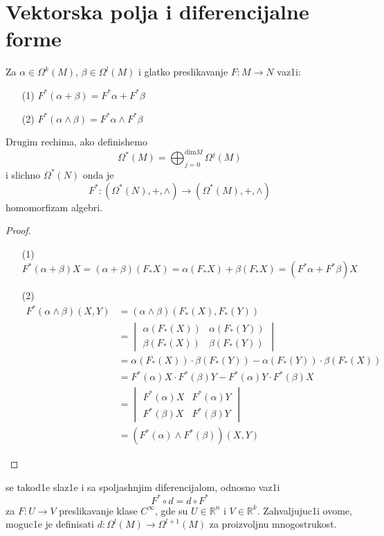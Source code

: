 \documentclass[a4paper,12pt]{article}
\newcommand{\latin}{\fontencoding{T1}\selectfont}
\newcommand{\RR}{\mathbb{R}}
\renewcommand{\dim}{\mathrm{dim}}
\begin{document}
\section{Vektorska polja i diferencijalne forme}

\begin{tvr}
Za $\alpha \in \Omega^k(M)$, $\beta \in \Omega^l(M)$ i glatko preslikavanje $F: M \to N$ vaz1i:
\begin{itemize}
\item[(1)] $F^* (\alpha + \beta) = F^* \alpha + F^* \beta$
\item[(2)] $F^* (\alpha \wedge \beta) = F^* \alpha \wedge F^* \beta$
\end{itemize}
Drugim rechima, ako definishemo \[\Omega^*(M) = \bigoplus^{\dim M}_{j=0} \Omega^j (M)\] i slichno $\Omega^*(N) $ onda je 
\[F^*: (\Omega^*(N), +, \wedge) \to (\Omega^*(M), +, \wedge)\]
homomorfizam algebri.
\end{tvr}

\begin{proof}
\begin{itemize}
\item[(1)] $F^*(\alpha + \beta) X = (\alpha + \beta) (F_* X) = \alpha(F_* X) + \beta(F_* X) = (F^* \alpha + F^* \beta) X$
\item[(2)]
\begin{align*}
 F^* (\alpha \wedge \beta) (X,Y) &= (\alpha \wedge \beta) (F_* (X), F_* (Y)) \\
 &= \begin{vmatrix} \alpha(F_*(X)) & \alpha(F_*(Y)) \\ \beta(F_*(X)) & \beta(F_*(Y)) \end{vmatrix} \\
 &= \alpha(F_*(X))\cdot \beta(F_*(Y)) - \alpha(F_*(Y)) \cdot \beta(F_*(X)) \\
 &= F^*(\alpha) X \cdot F^*(\beta) Y - F^*(\alpha) Y \cdot F^*(\beta) X \\
 &=  \begin{vmatrix} F^*(\alpha)X & F^*(\alpha)Y \\ F^*(\beta)X & F^*(\beta)Y \end{vmatrix} \\
 &= (F^*(\alpha) \wedge F^*(\beta))(X,Y)
\end{align*}
\end{itemize}
\end{proof}

\begin{nap} \latin{Pullback} \selectfont se takod1e slaz1e i sa spoljashnjim diferencijalom, odnosno vaz1i \[F^* \circ d  = d \circ F^* \]
za $F: U \to V$ preslikavanje klase $C^{\infty}$, gde su $U \in \RR^n$ i $V \in \RR^k$.
 Zahvaljujuc1i ovome, moguc1e je definisati $d: \Omega^l(M) \to \Omega^{l+1}(M)$ za proizvoljnu mno\-go\-stru\-kost. 
\end{nap}
\\ \\
\end{document}
